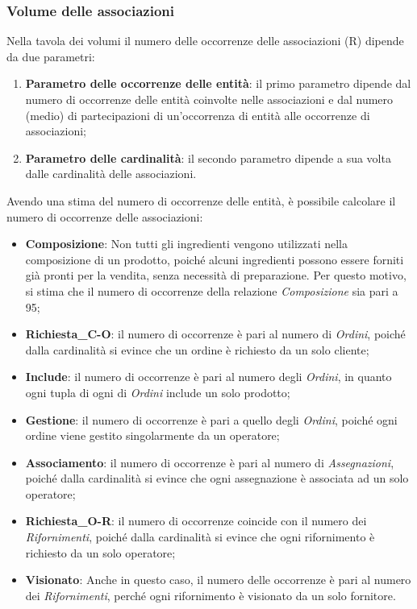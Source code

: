 \documentclass[12pt,a4paper]{article}
\begin{document}
    \subsubsection{Volume delle associazioni}
    \noindent
    Nella tavola dei volumi il numero delle occorrenze delle associazioni (R) dipende da due parametri:
    \begin{enumerate}[leftmargin=1.3em]
        \item \textbf{Parametro delle occorrenze delle entità}: il primo parametro dipende dal numero di occorrenze delle entità coinvolte nelle associazioni e dal numero (medio) di partecipazioni di un'occorrenza di entità alle occorrenze di associazioni;
        \item \textbf{Parametro delle cardinalità}: il secondo parametro dipende a sua volta dalle cardinalità delle associazioni.
    \end{enumerate}

    \vspace{8pt}
    \noindent
    Avendo una stima del numero di occorrenze delle entità, è possibile calcolare il numero di occorrenze delle associazioni:
    \begin{itemize}[leftmargin=1em]
        \item \textbf{Composizione}: Non tutti gli ingredienti vengono utilizzati nella composizione di un prodotto, poiché alcuni ingredienti possono essere forniti già pronti per la vendita, senza necessità di preparazione. Per questo motivo, si stima che il numero di occorrenze della relazione \textit{Composizione} sia pari a 95;
        \item  \textbf{Richiesta\_C-O}: il numero di occorrenze è pari al numero di \textit{Ordini}, poiché dalla cardinalità si evince che un ordine è richiesto da un solo cliente;
        \item \textbf{Include}: il numero di occorrenze è pari al numero degli \textit{Ordini}, in quanto ogni tupla di ogni  di \textit{Ordini} include un solo prodotto;
        \item \textbf{Gestione}: il numero di occorrenze è pari a quello degli \textit{Ordini}, poiché ogni ordine viene gestito singolarmente da un operatore;
        \item \textbf{Associamento}: il numero di occorrenze è pari al numero di \textit{Assegnazioni}, poiché dalla cardinalità si evince che ogni assegnazione è associata ad un solo operatore; 
        \item \textbf{Richiesta\_O-R}: il numero di occorrenze coincide con il numero dei \textit{Rifornimenti}, poiché dalla
        cardinalità si evince che  ogni rifornimento è richiesto da un solo operatore;
        \item \textbf{Visionato}: Anche in questo caso, il numero delle occorrenze è pari al numero dei \textit{Rifornimenti},  perché ogni rifornimento è visionato da un solo fornitore.
    \end{itemize}
\end{document}
